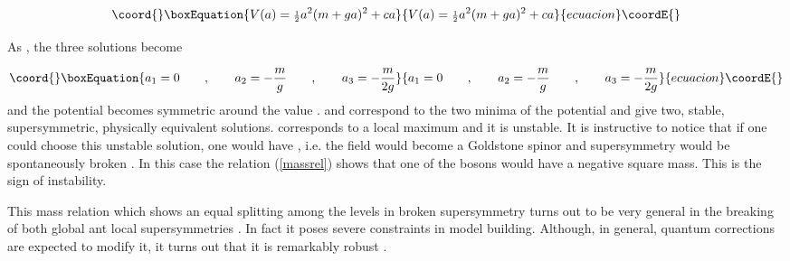 \documentclass[a4paper,11pt]{article}
\begin{document}
\begin{equation}\coord{}\boxEquation{ 
\label{potent}
V(a) =  {\scriptstyle {\frac{1}{2}}}a^2 (m+ga)^2 + ca
}{ 
V(a) =  {\scriptstyle {\frac{1}{2}}}a^2 (m+ga)^2 + ca
}{ecuacion}\coordE{}\end{equation}

As \coordHE{}, the three solutions become

\begin{equation}\coord{}\boxEquation{ 
\label{solut}
a_1 =0  \qquad , \qquad a_2 = -\frac{m}{g}  \qquad , \qquad a_3 =  -\frac{m}{2g}
}{ 
a_1 =0  \qquad , \qquad a_2 = -\frac{m}{g}  \qquad , \qquad a_3 =  -\frac{m}{2g}
}{ecuacion}\coordE{}\end{equation}
\noindent
and the potential becomes symmetric around the value \coordHE{}. \coordHE{} and \coordHE{} correspond to the two minima of the potential and give two, stable, supersymmetric, physically equivalent solutions. \coordHE{} corresponds to a local maximum and it is unstable. It is instructive to notice that if one could choose this unstable solution, one would have \coordHE{}, i.e. the \myHighlight{$\psi$}\coordHE{} field would become a Goldstone spinor and supersymmetry would be spontaneously broken \cite{IZ}. In this case the relation (\ref{massrel}) shows that one of the bosons would have a negative square mass. This is the sign of instability.

This mass relation which shows an equal splitting among the levels in broken supersymmetry turns out to be very general in the breaking of both global ant local supersymmetries \cite{FGP}. In fact it poses severe constraints in model building. Although, in general, quantum corrections are expected to modify it, it turns out that it is remarkably robust \cite{GI}.
\end{document}
